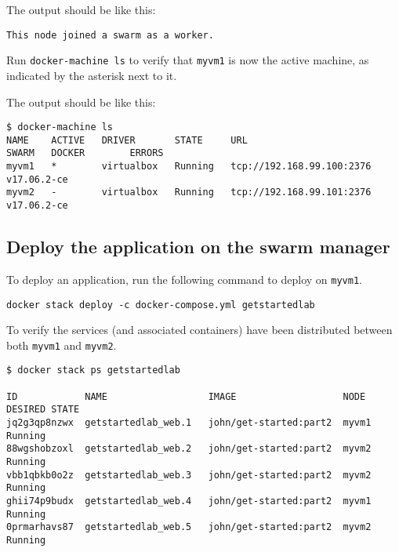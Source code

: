 The output should be like this:

\begin{lstlisting}
This node joined a swarm as a worker.
\end{lstlisting}

Run \texttt{docker-machine\ ls} to verify that \texttt{myvm1} is now the
active machine, as indicated by the asterisk next to it.

The output should be like this:

\begin{lstlisting}
$ docker-machine ls
NAME    ACTIVE   DRIVER       STATE     URL                         SWARM   DOCKER        ERRORS
myvm1   *        virtualbox   Running   tcp://192.168.99.100:2376           v17.06.2-ce   
myvm2   -        virtualbox   Running   tcp://192.168.99.101:2376           v17.06.2-ce   
\end{lstlisting}

\subsection{Deploy the application on the swarm manager}

To deploy an application, run the following command to deploy on
\texttt{myvm1}.

\begin{lstlisting}
docker stack deploy -c docker-compose.yml getstartedlab
\end{lstlisting}

To verify the services (and associated containers) have been distributed
between both \texttt{myvm1} and \texttt{myvm2}.

\begin{lstlisting}
$ docker stack ps getstartedlab

ID            NAME                  IMAGE                   NODE   DESIRED STATE
jq2g3qp8nzwx  getstartedlab_web.1   john/get-started:part2  myvm1  Running
88wgshobzoxl  getstartedlab_web.2   john/get-started:part2  myvm2  Running
vbb1qbkb0o2z  getstartedlab_web.3   john/get-started:part2  myvm2  Running
ghii74p9budx  getstartedlab_web.4   john/get-started:part2  myvm1  Running
0prmarhavs87  getstartedlab_web.5   john/get-started:part2  myvm2  Running
\end{lstlisting}

